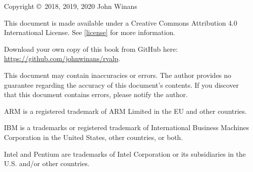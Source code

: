 \thispagestyle{plain}
\null\vfill
Copyright \copyright\ 2018, 2019, 2020 John Winans

This document is made available under a Creative Commons Attribution 4.0
International License.  See \autoref{license} for more information.

Download your own copy of this book from GitHub here:
\url{https://github.com/johnwinans/rvalp}.

This document may contain inaccuracies or errors.  The author provides no
guarantee regarding the accuracy of this document's contents.  If you
discover that this document contains errors, please notify the author.



ARM\textsuperscript{\textregistered} is a registered trademark of ARM Limited in the
EU and other countries.

IBM\textsuperscript{\textregistered} is a trademarks or registered trademark of International Business Machines
Corporation in the United States, other countries, or both.

Intel\textsuperscript{\textregistered} and Pentium\textsuperscript{\textregistered} are trademarks of Intel Corporation or its subsidiaries
in the U.S. and/or other countries.